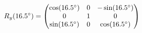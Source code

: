 \documentclass[preview]{standalone}
\begin{document}
\begin{align*}
\special{dvisvgm:raw <g id='unique000'>}R_y(16.5^\circ) = \begin{pmatrix} \cos(16.5^\circ) & 0 & -\sin(16.5^\circ) \\ 0 & 1 & 0 \\ \sin(16.5^\circ) & 0 & \cos(16.5^\circ) \end{pmatrix}\special{dvisvgm:raw </g>}
\end{align*}
\end{document}
